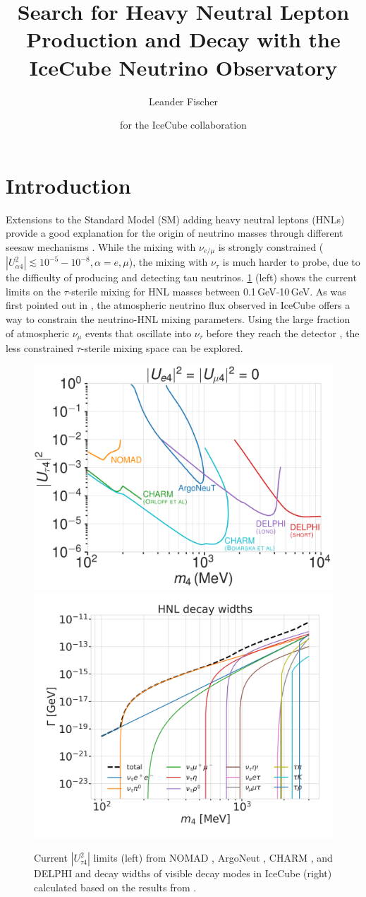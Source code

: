 \documentclass[a4paper,11pt]{article}
\title{Search for Heavy Neutral Lepton Production and Decay with the IceCube Neutrino Observatory}
\author*[a]{Leander Fischer}
\author{for the IceCube collaboration}
\affiliation[a]{DESY, D-15738 Zeuthen, Germany}
\begin{document}
\maketitle


\section{Introduction}

Extensions to the Standard Model (SM) adding heavy neutral leptons (HNLs) provide a good explanation for the origin of neutrino masses through different seesaw mechanisms \cite{10.1143/PTP.64.1103}. While the mixing with $\nu_{e/\mu}$ is strongly constrained ($|U_{\alpha4}^2| \lesssim 10^{-5}-10^{-8}, \alpha=e,\mu$), the mixing with $\nu_{\tau}$ is much harder to probe, due to the difficulty of producing and detecting tau neutrinos. \cref{fig:hnl_limits_and_decay_widths} (left) shows the current limits on the $\tau$-sterile mixing for HNL masses between 0.1\,GeV-10\,GeV. As was first pointed out in \cite{Coloma:2017ppo}, the atmospheric neutrino flux observed in IceCube offers a way to constrain the neutrino-HNL mixing parameters. Using the large fraction of atmospheric $\nu_{\mu}$ events that oscillate into $\nu_{\tau}$ before they reach the detector \cite{IceCube:2019dqi}, the less constrained $\tau$-sterile mixing space can be explored.

\begin{figure}[h]
  \includegraphics[width=.50\linewidth]{figures/UtauN_custom_plots_LF_grid_white.png}
  \includegraphics[width=.47\linewidth]{figures/hnl_decay_widths_log_new.png}
  \label{fig:hnl_visible_decay_widths}
  \caption{Current $|U_{\tau4}^2|$ limits (left) from NOMAD \cite{NOMAD:2001eyx}, ArgoNeut \cite{ArgoNeuT:2021clc}, CHARM \cite{Orloff:2002de, Boiarska:2021yho}, and DELPHI \cite{DELPHI:1996qcc} and decay widths of visible decay modes in IceCube (right) calculated based on the results from \cite{Gorbunov:2007ak}.}
  \label{fig:hnl_limits_and_decay_widths}
\end{figure}
\end{document}
